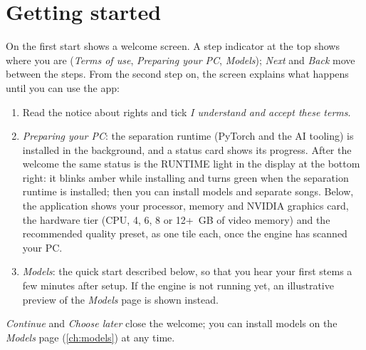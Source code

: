 \documentclass{covermaker}
\begin{document}
\chapter{Getting started}
On the first start \CM{} shows a welcome screen. A step indicator at the top
shows where you are (\emph{Terms of use}, \emph{Preparing your PC},
\emph{Models}); \emph{Next} and \emph{Back} move between the steps. From the
second step on, the screen explains what happens until you can use the app:
\begin{enumerate}
  \item Read the notice about rights and tick \emph{I understand and accept these
        terms}.
  \item \emph{Preparing your PC}: the separation runtime (PyTorch and the AI
        tooling) is installed in the background, and a status card shows its
        progress. After the welcome the same status is the \textsf{RUNTIME}
        light in the display at the bottom right: it blinks amber while
        installing and turns green when the separation runtime is installed;
        then you can install models and separate songs. Below, the
        application shows your processor, memory and NVIDIA graphics card, the
        hardware tier (CPU, 4, 6, 8 or 12+~GB of video memory) and the
        recommended quality preset, as one tile each, once the engine has
        scanned your PC.
  \item \emph{Models}: the quick start described below, so that you hear
        your first stems a few minutes after setup. If the engine is not
        running yet, an illustrative preview of the \emph{Models} page is
        shown instead.
\end{enumerate}
\emph{Continue} and \emph{Choose later} close the welcome; you can install
models on the \emph{Models} page (\autoref{ch:models}) at any time.
\end{document}

